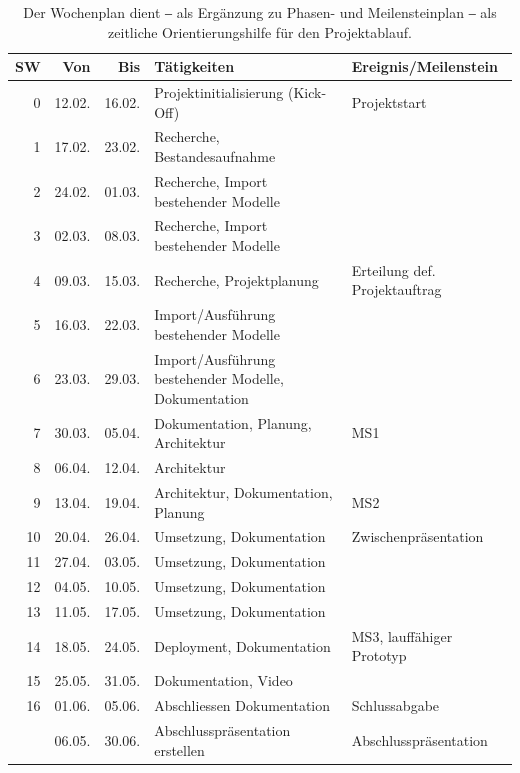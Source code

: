\begin{table}[tbh]
    \small{
        \begin{tabularx}{\textwidth}{r|r|r|X|X}
            SW & Von & Bis & Tätigkeiten & Ereignis/Meilenstein \\ \hline
            0 & 12.02. & 16.02. & Projektinitialisierung (Kick-Off) & Projektstart \\
            1 & 17.02. & 23.02. & Recherche, Bestandesaufnahme & \\
            2 & 24.02. & 01.03. & Recherche, Import bestehender Modelle & \\
            3 & 02.03. & 08.03. & Recherche, Import bestehender Modelle & \\
            4 & 09.03. & 15.03. & Recherche, Projektplanung & Erteilung def. Projektauftrag \\
            5 & 16.03. & 22.03. & Import/Ausführung bestehender Modelle & \\
            6 & 23.03. & 29.03. & Import/Ausführung bestehender Modelle, Dokumentation & \\
            7 & 30.03. & 05.04. & Dokumentation, Planung, Architektur & MS1 \\
            8 & 06.04. & 12.04. & Architektur & \\
            9 & 13.04. & 19.04. & Architektur, Dokumentation, Planung & MS2 \\
            10 & 20.04. & 26.04. & Umsetzung, Dokumentation & Zwischenpräsentation \\
            11 & 27.04. & 03.05. & Umsetzung, Dokumentation & \\
            12 & 04.05. & 10.05. & Umsetzung, Dokumentation & \\
            13 & 11.05. & 17.05. & Umsetzung, Dokumentation & \\
            14 & 18.05. & 24.05. & Deployment, Dokumentation & MS3, lauffähiger Prototyp \\
            15 & 25.05. & 31.05. & Dokumentation, Video & \\
            16 & 01.06. & 05.06. & Abschliessen Dokumentation & Schlussabgabe \\
            & 06.05. & 30.06. & Abschlusspräsentation erstellen & Abschlusspräsentation \\
        \end{tabularx}
    }
    \caption{Der Wochenplan dient ‒ als Ergänzung zu Phasen- und Meilensteinplan ‒ als zeitliche Orientierungshilfe für den Projektablauf.}
    \label{tbl:wochenplanung}
\end{table}

